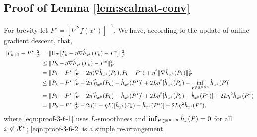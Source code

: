 \subsection{Proof of Lemma \ref{lem:scalmat-conv}}

For brevity let $P^{\star} = [\nabla^2 f (x^{\star})]^{- 1}$. We have, according to the
update of online gradient descent, that,
\begin{align}
 \| P_{k + 1} - P^{\star} \|_F^2  ={} & \| \Pi_{\mathcal{P}} [P_k - \eta \nabla \hat{h}_{x^k} (P_k) - P^{\star}]
  \|_F^2 \nonumber\\
  \leq{} & \| P_k - \eta \nabla \hat{h}_{x^k} (P_k) - P^{\star} \|_F^2 \nonumber\\
  ={} & \| P_k - P^{\star} \|_F^2 - 2 \eta \langle \nabla \hat{h}_{x^k} (P_k), P_k -
  P^{\star} \rangle + \eta^2 \| \nabla \hat{h}_{x^k} (P_k) \|_F^2 \nonumber\\
  \leq{} & \| P_k - P^{\star} \|_F^2 - 2 \eta [\hat{h}_{x^k} (P_k) - \hat{h}_{x^k}
  (P^{\star})] + 2 L \eta^2 [\hat{h}_{x^k} (P_k) - \inf_{P \in \mathbb{R}^{n\times n}} \hat{h}_{x^k} (P)] \label{eqn:proof-3-6-1}\\
  ={} & \| P_k - P^{\star} \|_F^2 - 2 \eta [\hat{h}_{x^k} (P_k) - \hat{h}_{x^k} (P^{\star})]
  + 2 L \eta^2 [\hat{h}_{x^k} (P_k) - \hat{h}_{x^k} (P^{\star})] + 2L \eta^2 \hat{h}_{x^k}
  (P^{\star}) \label{eqn:proof-3-6-2}\\
  ={} & \| P_k - P^{\star} \|_F^2 - 2 \eta(1 - \eta L) [\hat{h}_{x^k} (P_k) -
  \hat{h}_{x^k} (P^{\star})] + 2L \eta^2 \hat{h}_{x^k} (P^{\star}), \label{eqn:proof-3-6-3}
\end{align}
where \eqref{eqn:proof-3-6-1} uses $L$-smoothness and $\inf_{P \in \mathbb{R}^{n\times n}} \hat{h}_{x} (P)= 0$ for all $x \not\in \mathcal{X}^\star$; \eqref{eqn:proof-3-6-2} is a simple re-arrangement.

